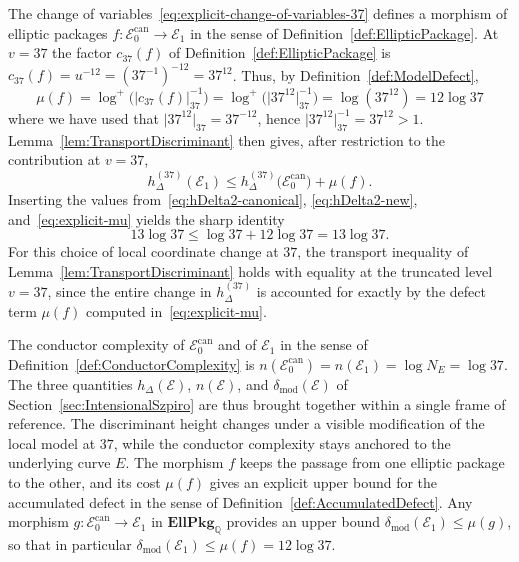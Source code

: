 \documentclass[10pt, reqno]{amsart}
\theoremstyle{plain}
\theoremstyle{definition}
\theoremstyle{plain}
\newcommand{\Q}{\mathbb{Q}}
\newcommand{\defect}{\delta_{\mathrm{mod}}}
\begin{document}
The change of variables~\eqref{eq:explicit-change-of-variables-37} defines a morphism of elliptic packages $f \colon \mathcal{E}_0^{\mathrm{can}} \to \mathcal{E}_1$ in the sense of Definition~\ref{def:EllipticPackage}. At $v=37$ the factor $c_{37}(f)$ of Definition~\ref{def:EllipticPackage} is $c_{37}(f) = u^{-12} = (37^{-1})^{-12} = 37^{12}$. Thus, by Definition~\ref{def:ModelDefect},
\begin{equation}\label{eq:explicit-mu}
  \mu(f)
  =
  \log^{+}\!\bigl(\lvert c_{37}(f) \rvert_{37}^{-1}\bigr)
  =
  \log^{+}\!\bigl(\lvert 37^{12} \rvert_{37}^{-1}\bigr)
  =
  \log(37^{12})
  =
  12 \log 37
\end{equation}
where we have used that $\lvert 37^{12}\rvert_{37}=37^{-12}$, hence $\lvert 37^{12}\rvert_{37}^{-1}=37^{12}>1$. Lemma~\ref{lem:TransportDiscriminant} then gives, after restriction to the contribution at $v=37$,
\[
  h_\Delta^{(37)}(\mathcal{E}_1)
  \le
  h_\Delta^{(37)}\bigl(\mathcal{E}_0^{\mathrm{can}}\bigr)
  +
  \mu(f).
\]
Inserting the values from~\eqref{eq:hDelta2-canonical}, \eqref{eq:hDelta2-new}, and~\eqref{eq:explicit-mu} yields the sharp identity
\[
  13\log 37
  \le
  \log 37 + 12\log 37
  =
  13\log 37.
\]
For this choice of local coordinate change at $37$, the transport inequality of Lemma~\ref{lem:TransportDiscriminant} holds with equality at the truncated level $v=37$, since the entire change in $h_\Delta^{(37)}$ is accounted for exactly by the defect term $\mu(f)$ computed in~\eqref{eq:explicit-mu}.

The conductor complexity of $\mathcal{E}_0^{\mathrm{can}}$ and of $\mathcal{E}_1$ in the sense of Definition~\ref{def:ConductorComplexity} is $n(\mathcal{E}_0^{\mathrm{can}}) = n(\mathcal{E}_1) = \log N_E = \log 37$. The three quantities $h_\Delta(\mathcal{E})$, $n(\mathcal{E})$, and $\defect(\mathcal{E})$ of Section~\ref{sec:IntensionalSzpiro} are thus brought together within a single frame of reference. The discriminant height changes under a visible modification of the local model at $37$, while the conductor complexity stays anchored to the underlying curve $E$. The morphism $f$ keeps the passage from one elliptic package to the other, and its cost $\mu(f)$ gives an explicit upper bound for the accumulated defect in the sense of Definition~\ref{def:AccumulatedDefect}. Any morphism $g \colon \mathcal{E}_0^{\mathrm{can}} \to \mathcal{E}_1$ in $\mathbf{EllPkg}_\Q$ provides an upper bound $\defect(\mathcal{E}_1) \le \mu(g)$, so that in particular $\defect(\mathcal{E}_1) \le \mu(f) = 12 \log 37$.
\end{document}
